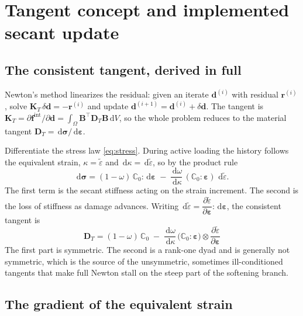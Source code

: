 \documentclass[11pt]{article}
\newcommand{\eps}{\bm{\varepsilon}}
\newcommand{\sig}{\bm{\sigma}}
\newcommand{\C}{\mathbb{C}}
\newcommand{\eqs}{\tilde{\varepsilon}}
\newcommand{\dd}{\,\mathrm{d}}
\begin{document}
\section{Tangent concept and implemented secant update}

\subsection{The consistent tangent, derived in full}

Newton's method linearizes the residual: given an iterate $\bm d^{(i)}$ with residual
$\bm r^{(i)}$, solve $\bm K_T\,\delta\bm d = -\bm r^{(i)}$ and update
$\bm d^{(i+1)} = \bm d^{(i)} + \delta\bm d$. The tangent is
$\bm K_T = \partial \bm f^{\text{int}}/\partial\bm d = \int_\Omega \bm B^{\!\top}
\bm D_T \bm B \dd V$, so the whole problem reduces to the material tangent
$\bm D_T = \dd\sig/\dd\eps$.

Differentiate the stress law \eqref{eq:stress}. During active loading the history follows
the equivalent strain, $\kappa=\eqs$ and $\dd\kappa=\dd\eqs$, so by the product rule
%
\begin{equation}
\dd\sig
= (1-\omega)\,\C_0:\dd\eps
\;-\; \frac{\dd\omega}{\dd\kappa}\,(\C_0:\eps)\,\dd\eqs .
\end{equation}
%
The first term is the secant stiffness acting on the strain increment. The second is the
loss of stiffness as damage advances. Writing $\dd\eqs = \dfrac{\partial\eqs}{\partial\eps}:\dd\eps$,
the consistent tangent is
%
\begin{equation}
\boxed{\;
\bm D_T = (1-\omega)\,\C_0
\;-\; \frac{\dd\omega}{\dd\kappa}\,
\bigl(\C_0:\eps\bigr)\otimes\frac{\partial\eqs}{\partial\eps}
\;}
\label{eq:tangent}
\end{equation}
%
The first part is symmetric. The second is a rank-one dyad and is generally not symmetric,
which is the source of the unsymmetric, sometimes ill-conditioned tangents that make full
Newton stall on the steep part of the softening branch.

\subsection{The gradient of the equivalent strain}
\end{document}

